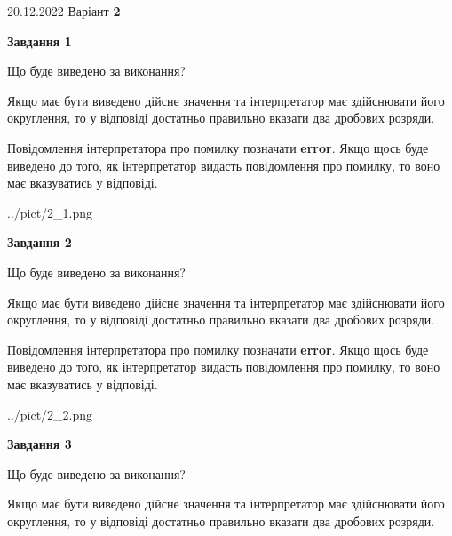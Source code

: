\documentclass[12pt, ukrainian]{article}
\begin{document}
{20.12.2022 Варіант \No \textbf { 2 }\par}
{
\begin {Large}

{\begin {center}\textbf{Завдання 1}\end {center}}\par
Що буде виведено за виконання? \par

Якщо має бути виведено дійсне значення та інтерпретатор має здійснювати його округлення, 
то у відповіді достатньо правильно вказати два дробових розряди.

Повідомлення інтерпретатора про помилку позначати \textbf{error}.
Якщо щось буде виведено до того, як інтерпретатор видасть повідомлення про помилку, 
то воно має вказуватись у відповіді. \par

\begin{center}
	{../pict/2_1.png}
\end{center}
\newpage

{\begin {center}\textbf{Завдання 2}\end {center}}\par
Що буде виведено за виконання? \par

Якщо має бути виведено дійсне значення та інтерпретатор має здійснювати його округлення, 
то у відповіді достатньо правильно вказати два дробових розряди.

Повідомлення інтерпретатора про помилку позначати \textbf{error}.
Якщо щось буде виведено до того, як інтерпретатор видасть повідомлення про помилку, 
то воно має вказуватись у відповіді. \par

\begin{center}
	{../pict/2_2.png}
\end{center}
\newpage

{\begin {center}\textbf{Завдання 3}\end {center}}\par
Що буде виведено за виконання? \par

Якщо має бути виведено дійсне значення та інтерпретатор має здійснювати його округлення, 
то у відповіді достатньо правильно вказати два дробових розряди.


\end{Large}}
\end{document}
